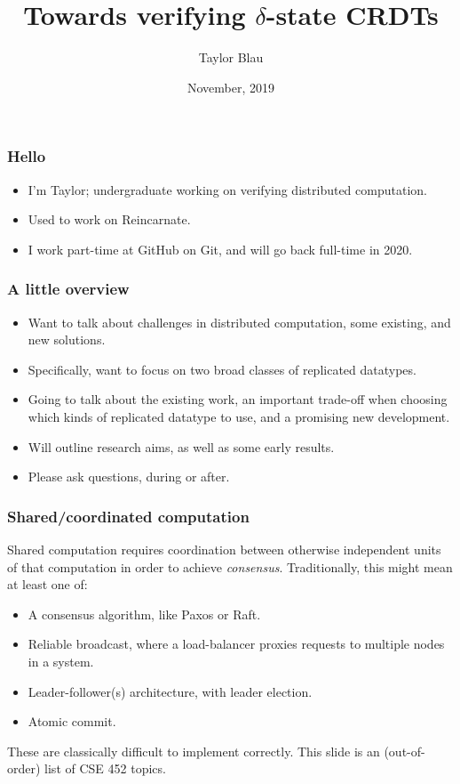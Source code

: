 \documentclass[aspectratio=169,compress]{beamer}
\title{Towards verifying $\delta$-state CRDTs}
\author{Taylor Blau}
\institute{PLSE Lunch \\ University of Washington}
\date{November, 2019}
\begin{document}
  \frame{\titlepage}

  \begin{frame}
    \frametitle{Hello}

    \begin{itemize}[<+->]
      \item I'm Taylor; undergraduate working on verifying distributed
        computation.
      \item Used to work on Reincarnate.
      \item I work part-time at GitHub on Git, and will go back full-time in
        2020.
    \end{itemize}
  \end{frame}

  \begin{frame}
    \frametitle{A little overview}

    \begin{itemize}[<+->]
      \item Want to talk about challenges in distributed computation, some
        existing, and new solutions.
      \item Specifically, want to focus on two broad classes of replicated
        datatypes.
      \item Going to talk about the existing work, an important trade-off when
        choosing which kinds of replicated datatype to use, and a promising new
        development.
      \item Will outline research aims, as well as some early results.
      \item Please ask questions, during or after.
    \end{itemize}
  \end{frame}

  \begin{frame}
    \frametitle{Shared/coordinated computation}

    Shared computation requires coordination between otherwise independent units
    of that computation in order to achieve \textit{consensus}. Traditionally,
    this might mean at least one of:

    \begin{itemize}[<+->]
      \item A consensus algorithm, like Paxos or Raft.
      \item Reliable broadcast, where a load-balancer proxies requests to
        multiple nodes in a system.
      \item Leader-follower(s) architecture, with leader election.
      \item Atomic commit.
    \end{itemize}

    \pause

    These are classically difficult to implement correctly. This slide is an
    (out-of-order) list of CSE 452 topics.
  \end{frame}
\end{document}

